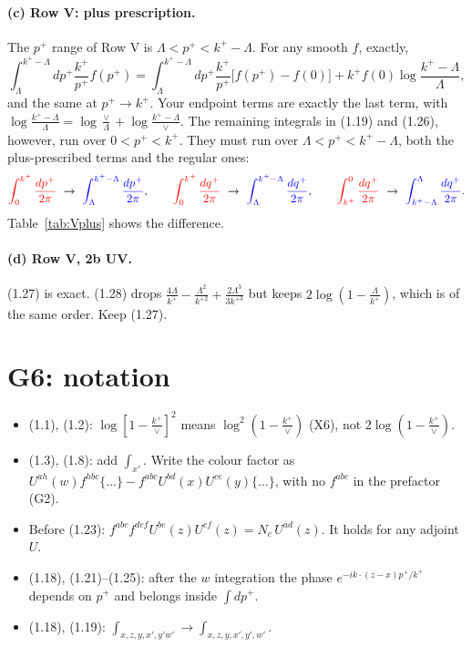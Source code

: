 \documentclass[10pt]{article}
\numberwithin{equation}{section}
\newcommand{\old}[1]{{\color{red}#1}}
\newcommand{\new}[1]{{\color{blue}#1}}
\begin{document}
\paragraph{(c) Row V: plus prescription.} The $p^+$ range of Row V is $\Lambda<p^+<k^+-\Lambda$. For any smooth $f$, exactly,
\begin{equation}
\int_\Lambda^{k^+-\Lambda}dp^+\frac{k^+}{p^+}f(p^+)=\int_\Lambda^{k^+-\Lambda}dp^+\frac{k^+}{p^+}\big[f(p^+)-f(0)\big]+k^+f(0)\log\frac{k^+-\Lambda}{\Lambda},
\end{equation}
and the same at $p^+\to k^+$. Your endpoint terms are exactly the last term, with $\log\frac{k^+-\Lambda}{\Lambda}=\log\frac{\vee}{\Lambda}+\log\frac{k^+-\Lambda}{\vee}$. The remaining integrals in (1.19) and (1.26), however, run over $0<p^+<k^+$. They must run over $\Lambda<p^+<k^+-\Lambda$, both the plus-prescribed terms and the regular ones:
\begin{equation}
\old{\int_0^{k^+}\frac{dp^+}{2\pi}}\ \to\ \new{\int_\Lambda^{k^+-\Lambda}\frac{dp^+}{2\pi}},\qquad \old{\int_0^{k^+}\frac{dq^+}{2\pi}}\ \to\ \new{\int_\Lambda^{k^+-\Lambda}\frac{dq^+}{2\pi}},\qquad\old{\int^0_{k^+}\frac{dq^+}{2\pi}}\ \to\ \new{\int^{\Lambda}_{k^+-\Lambda}\frac{dq^+}{2\pi}}.
\end{equation}
Table~\ref{tab:Vplus} shows the difference.

\paragraph{(d) Row V, 2b UV.} (1.27) is exact. (1.28) drops $\frac{4\Lambda}{k^+}-\frac{\Lambda^2}{k^{+2}}+\frac{2\Lambda^3}{3k^{+3}}$ but keeps $2\log(1-\frac{\Lambda}{k^+})$, which is of the same order. Keep (1.27).

\section{G6: notation}\label{sec:G6}
\begin{itemize}
\item (1.1), (1.2): $\log{\left[1-\frac{k^{+}}{\vee}\right]^{2}}$ means $\log^2(1-\frac{k^+}{\vee})$ (X6), not $2\log(1-\frac{k^+}{\vee})$.
\item (1.3), (1.8): add $\int_{x'}$. Write the colour factor as $U^{ah}(w)f^{hbc}\{\dots\}-f^{abc}U^{bd}(x)U^{ce}(y)\{\dots\}$, with no $f^{abc}$ in the prefactor (G2).
\item Before (1.23): $f^{abc}f^{def}U^{be}(z)U^{cf}(z)=N_c\,U^{ad}(z)$. It holds for any adjoint $U$.
\item (1.18), (1.21)--(1.25): after the $w$ integration the phase $e^{-ik\cdot(z-x)p^+/k^+}$ depends on $p^+$ and belongs inside $\int dp^+$.
\item (1.18), (1.19): $\int_{x,z,y,x',y'w'}\to\int_{x,z,y,x',y',w'}$.
\end{itemize}
\end{document}

